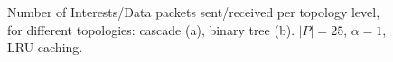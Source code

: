 \begin{figure}[h!]
    \centering


    \cprotect\caption{Number of Interests\slash Data packets sent\slash received 
        per topology level, for different topologies: cascade (a), binary tree (b). 
        $|P| = 25$, $\alpha = 1$, LRU caching.}
    \label{fig:exp-results-topologies}

\end{figure}



